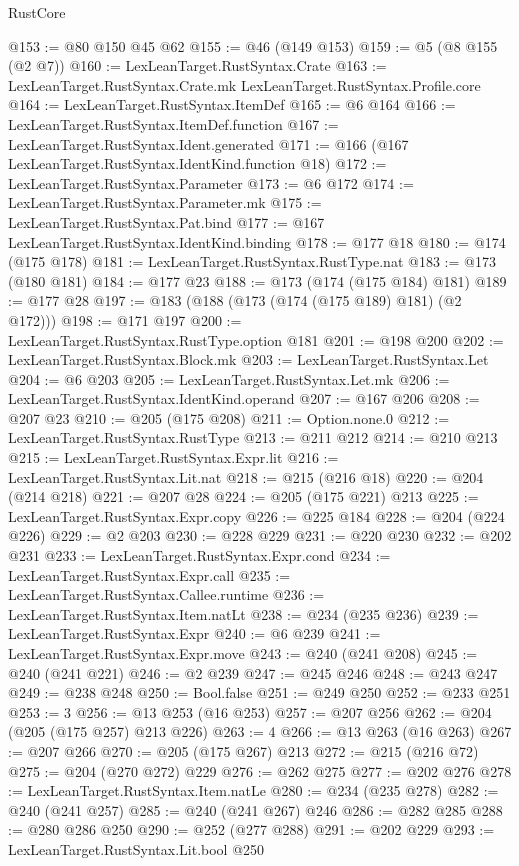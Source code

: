 \begin{lexlean}{RustCore}
\begin{coremodule}
@153 := @80 @150 @45 @62
@155 := @46 (@149 @153)
@159 := @5 (@8 @155 (@2 @7))
@160 := LexLeanTarget.RustSyntax.Crate
@163 := LexLeanTarget.RustSyntax.Crate.mk LexLeanTarget.RustSyntax.Profile.core
@164 := LexLeanTarget.RustSyntax.ItemDef
@165 := @6 @164
@166 := LexLeanTarget.RustSyntax.ItemDef.function
@167 := LexLeanTarget.RustSyntax.Ident.generated
@171 := @166 (@167 LexLeanTarget.RustSyntax.IdentKind.function @18)
@172 := LexLeanTarget.RustSyntax.Parameter
@173 := @6 @172
@174 := LexLeanTarget.RustSyntax.Parameter.mk
@175 := LexLeanTarget.RustSyntax.Pat.bind
@177 := @167 LexLeanTarget.RustSyntax.IdentKind.binding
@178 := @177 @18
@180 := @174 (@175 @178)
@181 := LexLeanTarget.RustSyntax.RustType.nat
@183 := @173 (@180 @181)
@184 := @177 @23
@188 := @173 (@174 (@175 @184) @181)
@189 := @177 @28
@197 := @183 (@188 (@173 (@174 (@175 @189) @181) (@2 @172)))
@198 := @171 @197
@200 := LexLeanTarget.RustSyntax.RustType.option @181
@201 := @198 @200
@202 := LexLeanTarget.RustSyntax.Block.mk
@203 := LexLeanTarget.RustSyntax.Let
@204 := @6 @203
@205 := LexLeanTarget.RustSyntax.Let.mk
@206 := LexLeanTarget.RustSyntax.IdentKind.operand
@207 := @167 @206
@208 := @207 @23
@210 := @205 (@175 @208)
@211 := Option.none.{0}
@212 := LexLeanTarget.RustSyntax.RustType
@213 := @211 @212
@214 := @210 @213
@215 := LexLeanTarget.RustSyntax.Expr.lit
@216 := LexLeanTarget.RustSyntax.Lit.nat
@218 := @215 (@216 @18)
@220 := @204 (@214 @218)
@221 := @207 @28
@224 := @205 (@175 @221) @213
@225 := LexLeanTarget.RustSyntax.Expr.copy
@226 := @225 @184
@228 := @204 (@224 @226)
@229 := @2 @203
@230 := @228 @229
@231 := @220 @230
@232 := @202 @231
@233 := LexLeanTarget.RustSyntax.Expr.cond
@234 := LexLeanTarget.RustSyntax.Expr.call
@235 := LexLeanTarget.RustSyntax.Callee.runtime
@236 := LexLeanTarget.RustSyntax.Item.natLt
@238 := @234 (@235 @236)
@239 := LexLeanTarget.RustSyntax.Expr
@240 := @6 @239
@241 := LexLeanTarget.RustSyntax.Expr.move
@243 := @240 (@241 @208)
@245 := @240 (@241 @221)
@246 := @2 @239
@247 := @245 @246
@248 := @243 @247
@249 := @238 @248
@250 := Bool.false
@251 := @249 @250
@252 := @233 @251
@253 := 3
@256 := @13 @253 (@16 @253)
@257 := @207 @256
@262 := @204 (@205 (@175 @257) @213 @226)
@263 := 4
@266 := @13 @263 (@16 @263)
@267 := @207 @266
@270 := @205 (@175 @267) @213
@272 := @215 (@216 @72)
@275 := @204 (@270 @272) @229
@276 := @262 @275
@277 := @202 @276
@278 := LexLeanTarget.RustSyntax.Item.natLe
@280 := @234 (@235 @278)
@282 := @240 (@241 @257)
@285 := @240 (@241 @267) @246
@286 := @282 @285
@288 := @280 @286 @250
@290 := @252 (@277 @288)
@291 := @202 @229
@293 := LexLeanTarget.RustSyntax.Lit.bool @250

\end{coremodule}
\end{lexlean}
